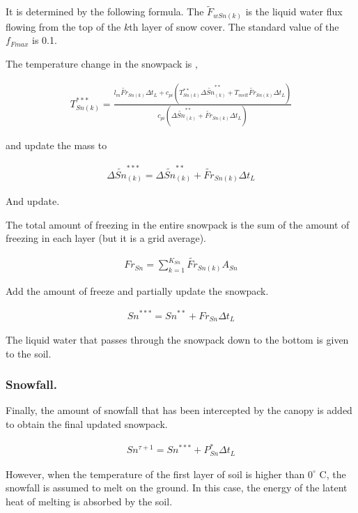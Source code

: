 It is determined by the following formula. The
\(\widetilde{F}_{wSn(k)}\) is the liquid water flux flowing from the top
of the \(k\)th layer of snow cover. The standard value of the
\(f_{Fmax}\) is 0.1.

The temperature change in the snowpack is ,

\begin{eqnarray}
 T_{Sn(k)}^{***} = \frac{l_m \widetilde{Fr}_{Sn(k)}\Delta t_L
   +c_{pi}(T_{Sn(k)}^{**}\Delta \widetilde{Sn}_{(k)}^{**} + T_{melt} \widetilde{Fr}_{Sn(k)}\Delta t_L ) }
  {c_{pi} (\Delta \widetilde{Sn}_{(k)}^{**} + \widetilde{Fr}_{Sn(k)}\Delta t_L)}
\end{eqnarray}

and update the mass to

\begin{eqnarray}
 \Delta \widetilde{Sn}_{(k)}^{***} = \Delta \widetilde{Sn}_{(k)}^{**} + \widetilde{Fr}_{Sn(k)}\Delta t_L
\end{eqnarray}

And update.

The total amount of freezing in the entire snowpack is the sum of the
amount of freezing in each layer (but it is a grid average).

\begin{eqnarray}
 Fr_{Sn} = \sum_{k=1}^{K_{Sn}} \widetilde{Fr}_{Sn(k)} A_{Sn}
\end{eqnarray}

Add the amount of freeze and partially update the snowpack.

\begin{eqnarray}
 Sn^{***} = Sn^{**} + Fr_{Sn} \Delta t_L
\end{eqnarray}

The liquid water that passes through the snowpack down to the bottom is
given to the soil.

\hypertarget{snowfall.}{%
\subsubsection{Snowfall.}\label{snowfall.}}

Finally, the amount of snowfall that has been intercepted by the canopy
is added to obtain the final updated snowpack.

\begin{eqnarray}
 Sn^{\tau+1} = Sn^{***} + P_{Sn}^* \Delta t_L
\end{eqnarray}

However, when the temperature of the first layer of soil is higher than
\(0^{\circ}\) C, the snowfall is assumed to melt on the ground. In this
case, the energy of the latent heat of melting is absorbed by the soil.

